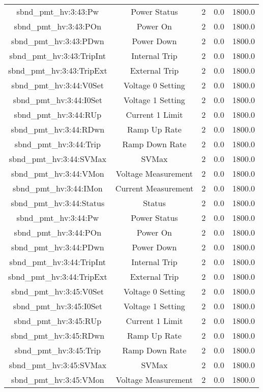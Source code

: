 \begin{center}
\begin{longtable}{c | c c c c }
sbnd\_pmt\_hv:3:43:Pw & Power Status & 2 & 0.0 & 1800.0\\ 
sbnd\_pmt\_hv:3:43:POn & Power On & 2 & 0.0 & 1800.0\\ 
sbnd\_pmt\_hv:3:43:PDwn & Power Down & 2 & 0.0 & 1800.0\\ 
sbnd\_pmt\_hv:3:43:TripInt & Internal Trip & 2 & 0.0 & 1800.0\\ 
sbnd\_pmt\_hv:3:43:TripExt & External Trip & 2 & 0.0 & 1800.0\\ 
sbnd\_pmt\_hv:3:44:V0Set & Voltage 0 Setting & 2 & 0.0 & 1800.0\\ 
sbnd\_pmt\_hv:3:44:I0Set & Voltage 1 Setting & 2 & 0.0 & 1800.0\\ 
sbnd\_pmt\_hv:3:44:RUp & Current 1 Limit & 2 & 0.0 & 1800.0\\ 
sbnd\_pmt\_hv:3:44:RDwn & Ramp Up Rate & 2 & 0.0 & 1800.0\\ 
sbnd\_pmt\_hv:3:44:Trip & Ramp Down Rate & 2 & 0.0 & 1800.0\\ 
sbnd\_pmt\_hv:3:44:SVMax & SVMax & 2 & 0.0 & 1800.0\\ 
sbnd\_pmt\_hv:3:44:VMon & Voltage Measurement & 2 & 0.0 & 1800.0\\ 
sbnd\_pmt\_hv:3:44:IMon & Current Measurement & 2 & 0.0 & 1800.0\\ 
sbnd\_pmt\_hv:3:44:Status & Status & 2 & 0.0 & 1800.0\\ 
sbnd\_pmt\_hv:3:44:Pw & Power Status & 2 & 0.0 & 1800.0\\ 
sbnd\_pmt\_hv:3:44:POn & Power On & 2 & 0.0 & 1800.0\\ 
sbnd\_pmt\_hv:3:44:PDwn & Power Down & 2 & 0.0 & 1800.0\\ 
sbnd\_pmt\_hv:3:44:TripInt & Internal Trip & 2 & 0.0 & 1800.0\\ 
sbnd\_pmt\_hv:3:44:TripExt & External Trip & 2 & 0.0 & 1800.0\\ 
sbnd\_pmt\_hv:3:45:V0Set & Voltage 0 Setting & 2 & 0.0 & 1800.0\\ 
sbnd\_pmt\_hv:3:45:I0Set & Voltage 1 Setting & 2 & 0.0 & 1800.0\\ 
sbnd\_pmt\_hv:3:45:RUp & Current 1 Limit & 2 & 0.0 & 1800.0\\ 
sbnd\_pmt\_hv:3:45:RDwn & Ramp Up Rate & 2 & 0.0 & 1800.0\\ 
sbnd\_pmt\_hv:3:45:Trip & Ramp Down Rate & 2 & 0.0 & 1800.0\\ 
sbnd\_pmt\_hv:3:45:SVMax & SVMax & 2 & 0.0 & 1800.0\\ 
sbnd\_pmt\_hv:3:45:VMon & Voltage Measurement & 2 & 0.0 & 1800.0\\ 

\end{longtable}
\end{center}
